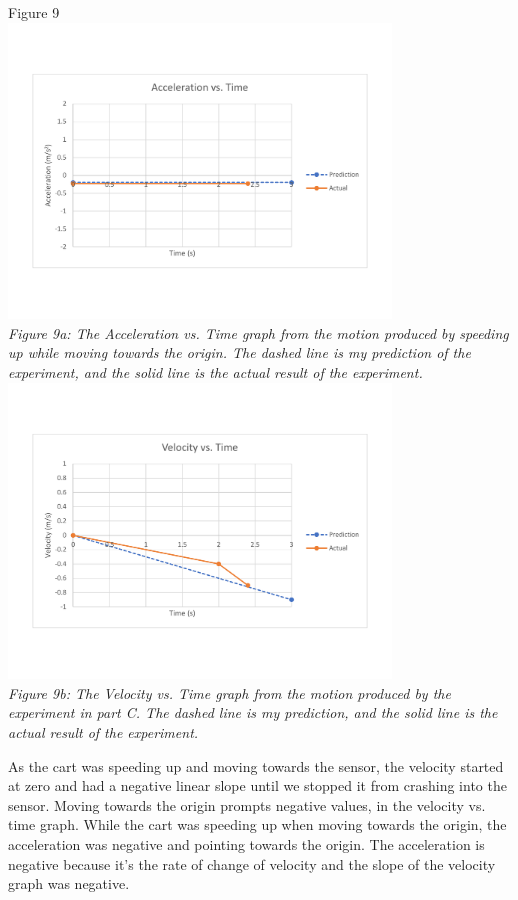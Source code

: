 \documentclass[aps,letterpaper,11pt]{revtex4}
\begin{document}
\begin{center}
Figure 9\\
\vspace{-10mm}
\includegraphics[width=4in]{PartCAcceleration.pdf}\\
\vspace{-10mm}
\textit{Figure 9a: The Acceleration vs. Time graph from the motion produced by speeding up while moving towards the origin. The dashed line is my prediction of the experiment, and the solid line is the actual result of the experiment.}\\
\includegraphics[width=4in]{PartCVelocity.pdf}\\
\vspace{-10mm}
\textit{Figure 9b: The Velocity vs. Time graph from the motion produced by the experiment in part C. The dashed line is my prediction, and the solid line is the actual result of the experiment.}
\end{center}

\newpage

As the cart was speeding up and moving towards the sensor, the velocity started at zero and had a negative linear slope until we stopped it from crashing into the sensor. Moving towards the origin prompts negative values, in the velocity vs. time graph. While the cart was speeding up when moving towards the origin, the acceleration was negative and pointing towards the origin. The acceleration is negative because it's the rate of change of velocity and the slope of the velocity graph was negative. 
\end{document}
